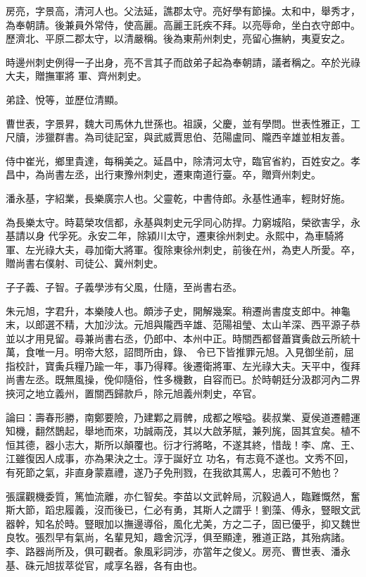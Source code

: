 \begin{pinyinscope}
 房亮，字景高，清河人也。父法延，譙郡太守。亮好學有節操。太和中，舉秀才，為奉朝請。後兼員外常侍，使高麗。高麗王託疾不拜。以亮辱命，坐白衣守郎中。歷濟北、平原二郡太守，以清嚴稱。後為東荊州刺史，亮留心撫納，夷夏安之。



 時邊州刺史例得一子出身，亮不言其子而啟弟子起為奉朝請，議者稱之。卒於光祿大夫，贈撫軍將
 軍、齊州刺史。



 弟詮、悅等，並歷位清顯。



 曹世表，字景昇，魏大司馬休九世孫也。祖謨，父慶，並有學問。世表性雅正，工尺牘，涉獵群書。為司徒記室，與武威賈思伯、范陽盧同、隴西辛雄並相友善。



 侍中崔光，鄉里貴達，每稱美之。延昌中，除清河太守，臨官省約，百姓安之。孝昌中，為尚書左丞，出行東豫州刺史，遷東南道行臺。卒，贈齊州刺史。



 潘永基，字紹業，長樂廣宗人也。父靈乾，中書侍郎。永基性通率，輕財好施。



 為長樂太守。時葛榮攻信都，永基與刺史元孚同心防捍。力窮城陷，榮欲害孚，永基請以身
 代孚死。永安二年，除潁川太守，遷東徐州刺史。永熙中，為車騎將軍、左光祿大夫，尋加衛大將軍。復除東徐州刺史，前後在州，為吏人所愛。卒，贈尚書右僕射、司徒公、冀州刺史。



 子子義、子智。子義學涉有父風，仕隨，至尚書右丞。



 朱元旭，字君升，本樂陵人也。頗涉子史，開解幾案。稍遷尚書度支郎中。神龜末，以郎選不精，大加沙汰。元旭與隴西辛雄、范陽祖瑩、太山羊深、西平源子恭並以才用見留。尋兼尚書右丞，仍郎中、本州中正。時關西都督蕭寶夤啟云所統十萬，食唯一月。明帝大怒，詔問所由，錄、
 令已下皆推罪元旭。入見御坐前，屈指校計，寶夤兵糧乃踰一年，事乃得釋。後遷衛將軍、左光祿大夫。天平中，復拜尚書左丞。既無風操，俛仰隨俗，性多機數，自容而已。於時朝廷分汲郡河內二界挾河之地立義州，置關西歸款戶，除元旭義州刺史，卒官。



 論曰：壽春形勝，南鄭要險，乃建鄴之肩髀，成都之喉嗌。裴叔業、夏侯道遷體運知機，翻然鵲起，舉地而來，功誠兩茂，其以大啟茅賦，兼列旄，固其宜矣。植不恒其德，器小志大，斯所以顛覆也。衍才行將略，不遂其終，惜哉！李、席、王、江雖復因人成事，亦為果決之士。淳于誕好立
 功名，有志竟不遂也。文秀不回，有死節之氣，非直身蒙嘉禮，遂乃子免刑戮，在我欲其罵人，忠義可不勉也？



 張讜觀機委質，篤恤流離，亦仁智矣。李苗以文武幹局，沉毅過人，臨難慨然，奮斯大節，蹈忠履義，沒而後已，仁必有勇，其斯人之謂乎！劉藻、傅永，豎眼文武器幹，知名於時。豎眼加以撫邊導俗，風化尤美，方之二子，固已優乎，抑又魏世良牧。張烈早有氣尚，名輩見知，趣舍沉浮，俱至顯達，雅道正路，其殆病諸。李、路器尚所及，俱可觀者。象風彩詞涉，亦當年之俊乂。房亮、曹世表、潘永基、硃元旭拔萃從官，咸享名器，各有由也。



\end{pinyinscope}